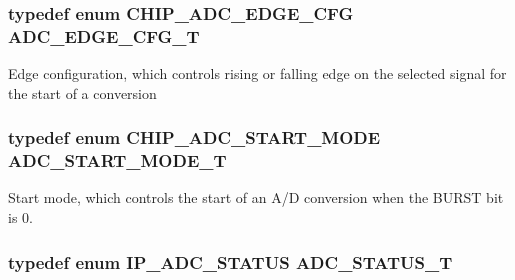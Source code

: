 \subsubsection[{\texorpdfstring{A\+D\+C\+\_\+\+E\+D\+G\+E\+\_\+\+C\+F\+G\+\_\+T}{ADC_EDGE_CFG_T}}]{\setlength{\rightskip}{0pt plus 5cm}typedef enum {\bf C\+H\+I\+P\+\_\+\+A\+D\+C\+\_\+\+E\+D\+G\+E\+\_\+\+C\+FG}  {\bf A\+D\+C\+\_\+\+E\+D\+G\+E\+\_\+\+C\+F\+G\+\_\+T}}\hypertarget{group__ADC__17XX__40XX_ga18d12879b004e16af3b47467a2d81d56}{}\label{group__ADC__17XX__40XX_ga18d12879b004e16af3b47467a2d81d56}
Edge configuration, which controls rising or falling edge on the selected signal for the start of a conversion 
\subsubsection[{\texorpdfstring{A\+D\+C\+\_\+\+S\+T\+A\+R\+T\+\_\+\+M\+O\+D\+E\+\_\+T}{ADC_START_MODE_T}}]{\setlength{\rightskip}{0pt plus 5cm}typedef enum {\bf C\+H\+I\+P\+\_\+\+A\+D\+C\+\_\+\+S\+T\+A\+R\+T\+\_\+\+M\+O\+DE}  {\bf A\+D\+C\+\_\+\+S\+T\+A\+R\+T\+\_\+\+M\+O\+D\+E\+\_\+T}}\hypertarget{group__ADC__17XX__40XX_ga68aae5a89b4dabc910e457a00e57ea8c}{}\label{group__ADC__17XX__40XX_ga68aae5a89b4dabc910e457a00e57ea8c}
Start mode, which controls the start of an A/D conversion when the B\+U\+R\+ST bit is 0. 
\subsubsection[{\texorpdfstring{A\+D\+C\+\_\+\+S\+T\+A\+T\+U\+S\+\_\+T}{ADC_STATUS_T}}]{\setlength{\rightskip}{0pt plus 5cm}typedef enum {\bf I\+P\+\_\+\+A\+D\+C\+\_\+\+S\+T\+A\+T\+US}  {\bf A\+D\+C\+\_\+\+S\+T\+A\+T\+U\+S\+\_\+T}}\hypertarget{group__ADC__17XX__40XX_ga5e2ef3f894759bbb12a9abf68518cbb7}{}\label{group__ADC__17XX__40XX_ga5e2ef3f894759bbb12a9abf68518cbb7}


